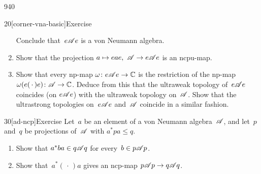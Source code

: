 \begin{parsec}{940}
\begin{point}{20}[corner-vna-basic]{Exercise}
\begin{enumerate}
Conclude that~$e\mathscr{A} e$ is a von Neumann algebra.
\item
Show that the projection $a\mapsto eae,\ \mathscr{A}\to e\mathscr{A} e$
is an ncpu-map.
\item
Show that every np-map $\omega\colon e\mathscr{A} e\to\mathbb{C}$
is the restriction
of the np-map $\omega(e(\,\cdot\,)e)\colon \mathscr{A}\to\mathbb{C}$.
Deduce from this that the ultraweak topology of~$e\mathscr{A} e$
coincides (on $e\mathscr{A} e$) with the ultraweak topology on~$\mathscr{A}$.
Show that the ultrastrong topologies on~$e\mathscr{A} e$ and~$\mathscr{A}$
coincide in a similar fashion.
\end{enumerate}
\spacingfix
\end{point}%
\begin{point}{30}[ad-ncp]{Exercise}%
Let~$a$ be an element of a von Neumann algebra~$\mathscr{A}$,
and let~$p$ and~$q$ be projections
of~$\mathscr{A}$ with $a^*pa\leq q$.
\begin{enumerate}
\item
Show that $a^*ba\in q\mathscr{A} q$
for every~$b\in p\mathscr{A} p$.
\item
Show that~$a^*(\,\cdot\,)a$
gives an ncp-map $p\mathscr{A} p\to q\mathscr{A} q$.
\end{enumerate}
\spacingfix%
\end{point}%
\end{parsec}%
